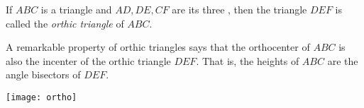 \documentclass{article}
\begin{document}
If $ABC$ is a triangle and $AD, DE, CF$ are its three , then the triangle $DEF$ is called the \emph{orthic triangle} of $ABC$.

A remarkable property of orthic triangles says that the orthocenter of $ABC$ is also the incenter of the orthic triangle $DEF$. That is, the heights of $ABC$ are the angle bisectors of $DEF$.

\begin{center}
\texttt{[image: ortho]}
\end{center}
\end{document}
